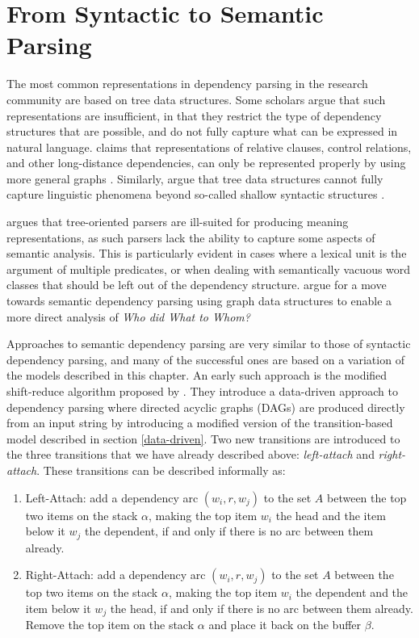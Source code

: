 \section{From Syntactic to Semantic Parsing}
\label{syntactic-semantic}

The most common representations in dependency parsing in the research community are based on tree data structures. Some scholars argue that such representations are insufficient, in that they restrict the type of dependency structures that are possible, and do not fully capture what can be expressed in natural language. \citeauthor{Hudson:90} claims that representations of relative clauses, control relations, and other long-distance dependencies, can only be represented properly by using more general graphs \cite{Hudson:90}. Similarly, \citeauthor{Sagae:Tsuji:08} argue that tree data structures cannot fully capture linguistic phenomena beyond so-called shallow syntactic structures \cite{Sagae:Tsuji:08}.

 argues that tree-oriented parsers are ill-suited for producing meaning representations, as such parsers lack the ability to capture some aspects of semantic analysis. This is particularly evident in cases where a lexical unit is the argument of multiple predicates, or when dealing with semantically vacuous word classes that should be left out of the dependency structure.  argue for a move towards semantic dependency parsing using graph data structures to enable a more direct analysis of \textit{Who did What to Whom?}

Approaches to semantic dependency parsing are very similar to those of syntactic dependency parsing, and many of the successful ones are based on a variation of the models described in this chapter. An early such approach is the modified shift-reduce algorithm proposed by . They introduce a data-driven approach to dependency parsing where directed acyclic graphs (DAGs) are produced directly from an input string by introducing a modified version of the transition-based model described in section \ref{data-driven}. Two new transitions are introduced to the three transitions that we have already described above: \textit{left-attach} and \textit{right-attach}. These transitions can be described informally as:

\begin{enumerate}
\item Left-Attach: add a dependency arc $(w_i, r, w_j)$ to the set $A$ between the top two items on the stack $\alpha$, making the top item $w_i$ the head and the item below it $w_j$ the dependent, if and only if there is no arc between them already.
\item Right-Attach: add a dependency arc $(w_i, r, w_j)$ to the set $A$ between the top two items on the stack $\alpha$, making the top item $w_i$ the dependent and the item below it $w_j$ the head, if and only if there is no arc between them already. Remove the top item on the stack $\alpha$ and place it back on the buffer $\beta$.
\end{enumerate}

